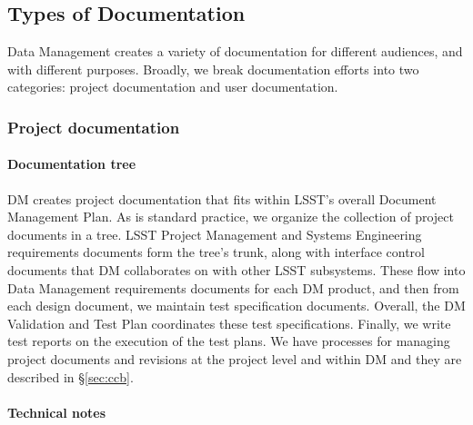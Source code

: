 \subsection{Types of Documentation}
\label{sec:doc_types}

Data Management creates a variety of documentation for different audiences, and with different purposes.
Broadly, we break documentation efforts into two categories: project documentation and user documentation.

\subsubsection{Project documentation}
\label{sec:project_docs}

\paragraph{Documentation tree}

DM creates project documentation that fits within LSST's overall Document Management Plan.\cite{LPM-51}
As is standard practice, we organize the collection of project documents in a tree\cite{LDM-294}.
LSST Project Management and Systems Engineering requirements documents form the tree's trunk, along with interface control documents that DM collaborates on with other LSST subsystems.
These flow into Data Management requirements documents for each DM product, and then from each design document, we maintain test specification documents.
Overall, the DM Validation and Test Plan\cite{LDM-503} coordinates these test specifications.
Finally, we write test reports on the execution of the test plans.
We have processes for managing project documents and revisions at the project level and within DM and they are described in \S\ref{sec:ccb}.

\paragraph{Technical notes}

